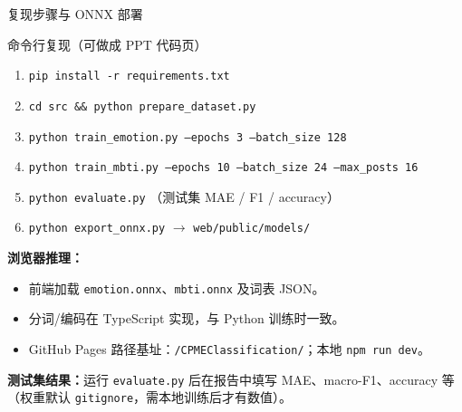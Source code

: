 \begin{frame}{复现步骤与 ONNX 部署}
    \small
    \begin{block}{命令行复现（可做成 PPT 代码页）}
        \begin{enumerate}
            \item \texttt{pip install -r requirements.txt}
            \item \texttt{cd src \&\& python prepare\_dataset.py}
            \item \texttt{python train\_emotion.py --epochs 3 --batch\_size 128}
            \item \texttt{python train\_mbti.py --epochs 10 --batch\_size 24 --max\_posts 16}
            \item \texttt{python evaluate.py} \quad （测试集 MAE / F1 / accuracy）
            \item \texttt{python export\_onnx.py} \quad $\to$ \texttt{web/public/models/}
        \end{enumerate}
    \end{block}

    \textbf{浏览器推理：}
    \begin{itemize}
        \item 前端加载 \texttt{emotion.onnx}、\texttt{mbti.onnx} 及词表 JSON。
        \item 分词/编码在 TypeScript 实现，与 Python 训练时一致。
        \item GitHub Pages 路径基址：\texttt{/CPMEClassification/}；本地 \texttt{npm run dev}。
    \end{itemize}

    \textbf{测试集结果：}运行 \texttt{evaluate.py} 后在报告中填写 MAE、macro-F1、accuracy 等（权重默认 \texttt{gitignore}，需本地训练后才有数值）。
\end{frame}
